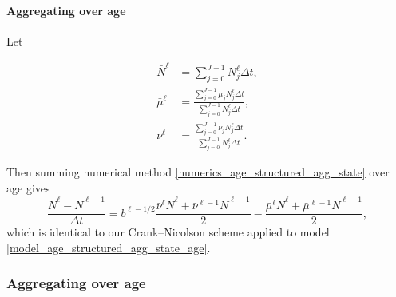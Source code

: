 \documentclass{jpmarticle}
\let\subequationsorig\subequations%
\let\endsubequationsorig\endsubequations%
\renewenvironment{subequations}{
  \subequationsorig
  \renewcommand{\theequation}{\theparentequation.\arabic{equation}}
}{
  \endsubequationsorig
}
\begin{document}
\paragraph{Aggregating over age}

Let
\begin{subequations}
  \begin{align}
    \bar{N}^{\ell}
    &= \sum_{j = 0}^{J - 1} N_j^{\ell} \Delta t,
    \\
    \bar{\mu}^{\ell}
    &= \frac{\sum_{j = 0}^{J - 1} \mu_j N_j^{\ell} \Delta t}
    {\sum_{j = 0}^{J - 1} N_j^{\ell} \Delta t},
    \\
    \bar{\nu}^{\ell}
    &= \frac{\sum_{j = 0}^{J - 1} \nu_j N_j^{\ell} \Delta t}
    {\sum_{j = 0}^{J - 1} N_j^{\ell} \Delta t}.
  \end{align}
\end{subequations}
Then summing numerical method
\eqref{numerics_age_structured_agg_state} over age gives
\begin{equation}
  \label{numerics_age_structured_agg_state_age}
  \frac{\bar{N}^{\ell} - \bar{N}^{\ell - 1}}{\Delta t}
  = b^{\ell - 1 / 2}
  \frac{\bar{\nu}^{\ell} \bar{N}^{\ell}
    + \bar{\nu}^{\ell - 1} \bar{N}^{\ell - 1}}{2}
  - \frac{\bar{\mu}^{\ell} \bar{N}^{\ell}
    + \bar{\mu}^{\ell - 1} \bar{N}^{\ell - 1}}{2},
\end{equation}
which is identical to our Crank--Nicolson scheme applied to model
\eqref{model_age_structured_agg_state_age}.


\subsubsection{Aggregating over age}
\end{document}
